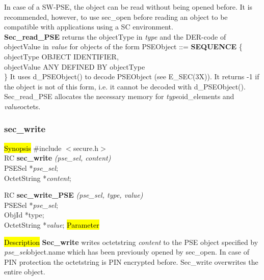 In case of a SW-PSE, the object can be read without being opened before. It is recommended, however,
to use sec\_open before reading an object to be compatible with applications using
a SC environment. \\ [1em]
{\bf Sec\_read\_PSE} returns the objectType in {\em type} and the DER-code of objectValue
in {\em value} for objects of the form
\bc
{\small
\bvtab
PSEObject ::= \3 {\bf SEQUENCE} \{ \\
\5 objectType \3 OBJECT IDENTIFIER, \\
\5 objectValue \3 ANY DEFINED BY objectType \\
\3 \}
\evtab
}
\ec
It uses d\_PSEObject() to decode PSEObject (see E\_SEC(3X)).
It returns -1 if the object is not of this form, i.e. it cannot be decoded with d\_PSEObject().
Sec\_read\_PSE allocates the necessary memory for {\em type}\pf oid\_elements and {\em value}\pf octets.

\subsubsection{sec\_write}
\label{sec_write}
\hl{Synopsis}
\#include $<$secure.h$>$ \\ [0.5cm]
RC {\bf sec\_write} {\em (pse\_sel, content)} \\
PSESel *{\em pse\_sel}; \\
OctetString *{\em content}; 

RC {\bf sec\_write\_PSE} {\em (pse\_sel, type, value)} \\
PSESel *{\em pse\_sel}; \\
ObjId *type; \\
OctetString *{\em value};
\hl{Parameter}




\hl{Description}
{\bf Sec\_write} writes octetstring {\em content} to the PSE object specified by 
{\em pse\_sel}\pf object.name which has been previously opened by sec\_open. 
In case of PIN protection the octetstring is
PIN encrypted before. Sec\_write overwrites the entire object. 

